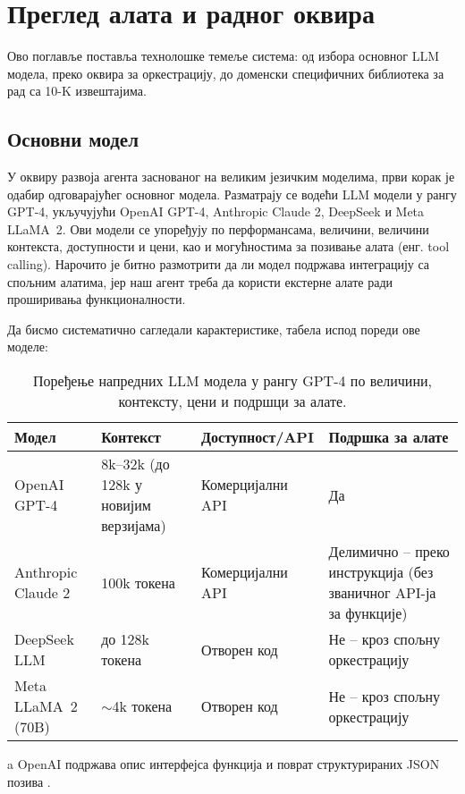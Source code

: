 \chapter{Преглед алата и радног оквира}
\label{sec:llm_agent}

Ово поглавље поставља технолошке темеље система: од избора основног LLM модела, преко оквира за оркестрацију, до доменски специфичних библиотека за рад са 10-K извештајима.

\section{Основни модел}

У оквиру развоја агента заснованог на великим језичким моделима, први корак је одабир одговарајућег основног модела. Разматрају се водећи LLM модели у рангу GPT-4, укључујући OpenAI GPT-4, Anthropic Claude 2, DeepSeek и Meta LLaMA~2. Ови модели се упоређују по перформансама, величини, величини контекста, доступности и цени, као и могућностима за позивање алата (енг. tool calling). Нарочито је битно размотрити да ли модел подржава интеграцију са спољним алатима, јер наш агент треба да користи екстерне алате ради проширивања функционалности.

Да бисмо систематично сагледали карактеристике, табела испод пореди ове моделе:

\begin{table}[h]
\centering
\footnotesize
\begin{threeparttable}
\begin{tabular}{|m{3.5cm}|m{3.0cm}|m{3.8cm}|m{4.2cm}|}
\hline
    \textbf{Модел} & \textbf{Контекст} & \textbf{Доступност/API} & \textbf{Подршка за алате} \\
\hline
OpenAI GPT-4 & 8k--32k (до 128k у новијим верзијама) & Комерцијални API & Да\tnote{a} \\
\hline
Anthropic Claude 2 & 100k токена & Комерцијални API & Делимично -- преко инструкција (без званичног API-ја за функције) \\
\hline
DeepSeek LLM & до 128k токена & Отворен код & Не -- кроз спољну оркестрацију \\
\hline
Meta LLaMA~2 (70B) & \(\sim\)4k токена & Отворен код & Не -- кроз спољну оркестрацију \\
\hline
\end{tabular}
\begin{tablenotes}
\item[a] OpenAI подржава опис интерфејса функција и поврат структурираних JSON позива \cite{openai_function_calling_2023}.
\end{tablenotes}
\end{threeparttable}
\caption{Поређење напредних LLM модела у рангу GPT-4 по величини, контексту, цени и подршци за алате.}
\label{tab:llm_comparison}
\end{table}

